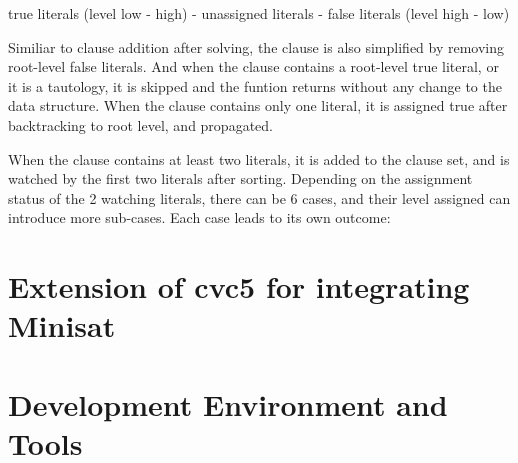 true literals (level low - high) - unassigned literals - false literals (level high - low)

Similiar to clause addition after solving, the clause is also simplified by removing root-level false literals. And when the clause contains a root-level true literal, or it is a tautology, it is skipped and the funtion returns without any change to the data structure. When the clause contains only one literal, it is assigned true after backtracking to root level, and propagated.

When the clause contains at least two literals, it is added to the clause set, and is watched by the first two literals after sorting. Depending on the assignment status of the 2 watching literals, there can be 6 cases, and their level assigned can introduce more sub-cases. Each case leads to its own outcome: 




\section{Extension of cvc5 for integrating Minisat}




\section{Development Environment and Tools}


